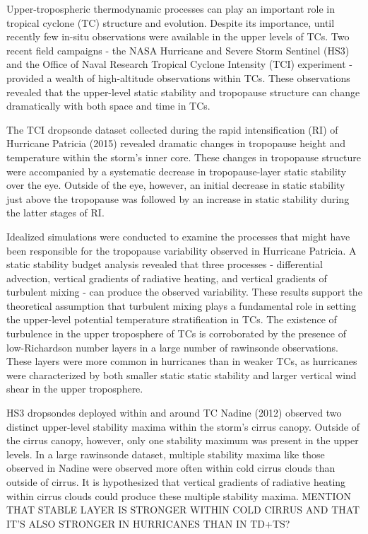  


\indent \indent Upper-tropospheric thermodynamic processes can play an important role in tropical cyclone (TC) structure and evolution.
Despite its importance, until recently few in-situ observations were available in the upper levels of TCs.
Two recent field campaigns - the NASA Hurricane and Severe Storm Sentinel (HS3) and the Office of Naval Research Tropical Cyclone Intensity (TCI) experiment - provided a wealth of high-altitude observations within TCs.
These observations revealed that the upper-level static stability and tropopause structure can change dramatically with both space and time in TCs.

The TCI dropsonde dataset collected during the rapid intensification (RI) of Hurricane Patricia (2015) revealed dramatic changes in tropopause height and temperature within the storm's inner core.
These changes in tropopause structure were accompanied by a systematic decrease in tropopause-layer static stability over the eye.
Outside of the eye, however, an initial decrease in static stability just above the tropopause was followed by an increase in static stability during the latter stages of RI.

Idealized simulations were conducted to examine the processes that might have been responsible for the tropopause variability observed in Hurricane Patricia.
A static stability budget analysis revealed that three processes - differential advection, vertical gradients of radiative heating, and vertical gradients of turbulent mixing - can produce the observed variability.
These results support the theoretical assumption that turbulent mixing plays a fundamental role in setting the upper-level potential temperature stratification in TCs.
The existence of turbulence in the upper troposphere of TCs is corroborated by the presence of low-Richardson number layers in a large number of rawinsonde observations.
These layers were more common in hurricanes than in weaker TCs, as hurricanes were characterized by both smaller static static stability and larger vertical wind shear in the upper troposphere.

HS3 dropsondes deployed within and around TC Nadine (2012) observed two distinct upper-level stability maxima within the storm's cirrus canopy.
Outside of the cirrus canopy, however, only one stability maximum was present in the upper levels.
In a large rawinsonde dataset, multiple stability maxima like those observed in Nadine were observed more often within cold cirrus clouds than outside of cirrus.
It is hypothesized that vertical gradients of radiative heating within cirrus clouds could produce these multiple stability maxima.
MENTION THAT STABLE LAYER IS STRONGER WITHIN COLD CIRRUS AND THAT IT'S ALSO STRONGER IN HURRICANES THAN IN TD+TS?
